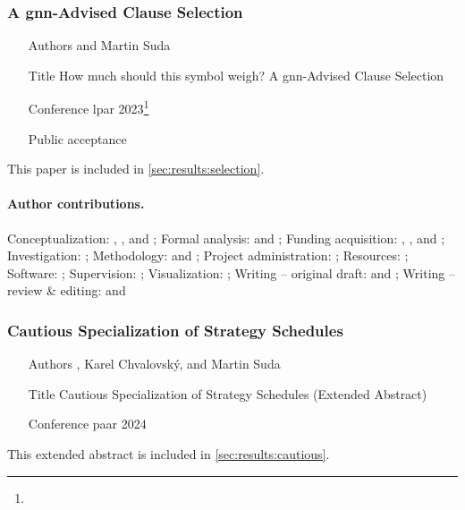 \subsubsection{A \acrshort{gnn}-Advised Clause Selection}

\begin{itemize}
\item[Authors]  and Martin Suda
\item[Title] How much should this symbol weigh? A \acrshort{gnn}-Advised Clause Selection \cite{DBLP:conf/lpar/Bartek023}
\item[Conference] \Acrfull{lpar} 2023\footnote{}
\item[Public acceptance] 
\end{itemize}

This paper is included in \cref{sec:results:selection}.

\paragraph{Author contributions.}
Conceptualization:            \MS{}, \FB{}, and \CK{};
Formal analysis:              \FB{} and \MS{};
Funding acquisition:          \MS{}, \JU{}, and \FB{};
Investigation:                \FB{};
Methodology:                  \FB{} and \MS{};
Project administration:       \MS{};
Resources:                    \JU{};
Software:                     \FB{};
Supervision:                  \MS{};
Visualization:                \FB{};
Writing -- original draft:    \FB{} and \MS{};
Writing -- review \& editing: \FB{} and \MS{}

\subsubsection{Cautious Specialization of Strategy Schedules}

\begin{itemize}
\item[Authors] , Karel Chvalovský, and Martin Suda
\item[Title] Cautious Specialization of Strategy Schedules (Extended Abstract) \cite{DBLP:conf/paar/BartekC024}
\item[Conference] \Acrfull{paar} 2024
\end{itemize}

This extended abstract is included in \cref{sec:results:cautious}.

